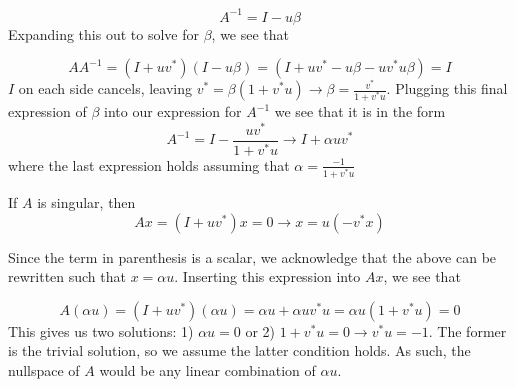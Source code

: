 \documentclass[a4paper,12pt]{article}
\begin{document}
\begin{equation}
A^{-1}=I- u\beta 
\end{equation} Expanding this out to solve for $\beta$, we see that

\begin{equation}
AA^{-1}=(I+uv^*)(I - u\beta)=(I + uv^* -u\beta - uv^* u\beta)=I
\end{equation} $I$ on each side cancels, leaving $v^* = \beta (1 + v^* u) \rightarrow \beta = \frac{v^*}{1+v^*u}$. Plugging this final expression of $\beta$ into our expression for $A^{-1}$ we see that it is in the form
\begin{equation}
A^{-1}= I - \frac{uv^*}{1+v^*u} \rightarrow I+\alpha uv^*
\end{equation} where the last expression holds assuming that $\alpha = \frac{-1}{1+v^*u}$


If $A$ is singular, then 
\begin{equation}
Ax=(I+uv^*)x=0 \rightarrow x=u(-v^*x)
\end{equation}

Since the term in parenthesis is a scalar, we acknowledge that the above can be rewritten such that $x=\alpha u$. Inserting this expression into $Ax$, we see that 

\begin{equation}
A(\alpha u) =(I + uv^*)(\alpha u) = \alpha u + \alpha u v^*u = \alpha u (1 + v^*u)=0
\end{equation}
This gives us two solutions: 1) $\alpha u = 0 $ or 2) $1+v^*u = 0 \rightarrow v^*u = -1$. The former is the trivial solution, so we assume the latter condition holds. As such, the nullspace of $A$ would be any linear combination of $\alpha u$. 
\end{document}
